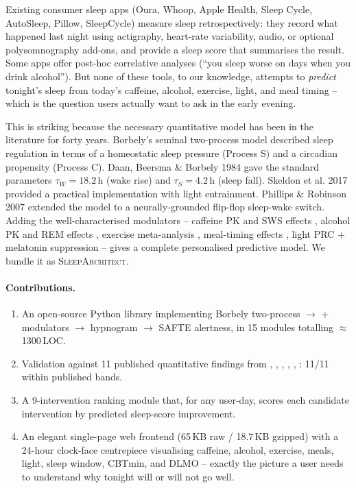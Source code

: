\documentclass[10pt,twocolumn]{article}
\begin{document}
Existing consumer sleep apps (Oura, Whoop, Apple Health,
Sleep Cycle, AutoSleep, Pillow, SleepCycle) measure sleep
retrospectively: they record what happened last night using
actigraphy, heart-rate variability, audio, or optional polysomnography
add-ons, and provide a sleep score that summarises the result.
Some apps offer post-hoc correlative analyses (``you sleep worse on
days when you drink alcohol'').  But none of these tools, to our
knowledge, attempts to \emph{predict} tonight's sleep from today's
caffeine, alcohol, exercise, light, and meal timing -- which is the
question users actually want to ask in the early evening.

This is striking because the necessary quantitative model has been
in the literature for forty years.  Borbely's seminal two-process
model \citep{borbely1982two} described sleep regulation in terms of
a homeostatic sleep pressure (Process S) and a circadian propensity
(Process C).  Daan, Beersma \& Borbely 1984
\citep{daan1984timing} gave the standard parameters
$\tau_W = 18.2$\,h (wake rise) and $\tau_S = 4.2$\,h (sleep fall).
Skeldon et al. 2017 \citep{skeldon2017} provided a practical
implementation with light entrainment.  Phillips \& Robinson 2007
\citep{phillips2007} extended the model to a neurally-grounded
flip-flop sleep-wake switch.  Adding the well-characterised modulators
-- caffeine PK and SWS effects \citep{carrillo2000,drake2013,clark2017},
alcohol PK and REM effects \citep{ebrahim2013}, exercise meta-analysis
\citep{stutz2019}, meal-timing effects \citep{crispim2011,iao2021},
light PRC + melatonin suppression
\citep{khalsa2003,zeitzer2000,brainard2001} -- gives a complete
personalised predictive model.  We bundle it as
\textsc{SleepArchitect}.

\paragraph{Contributions.}
\begin{enumerate}\setlength{\itemsep}{0pt}
\item An open-source Python library implementing Borbely two-process
$\rightarrow$ + modulators $\rightarrow$ hypnogram $\rightarrow$
SAFTE alertness, in 15 modules totalling $\approx$\,1300\,LOC.
\item Validation against 11 published quantitative findings from
\citet{drake2013}, \citet{clark2017}, \citet{ebrahim2013},
\citet{zeitzer2000}, \citet{khalsa2003}, \citet{brainard2001}: 11/11
within published bands.
\item A 9-intervention ranking module that, for any user-day, scores
each candidate intervention by predicted sleep-score improvement.
\item An elegant single-page web frontend (65\,KB raw /
18.7\,KB gzipped) with a 24-hour clock-face centrepiece visualising
caffeine, alcohol, exercise, meals, light, sleep window, CBTmin,
and DLMO -- exactly the picture a user needs to understand why
tonight will or will not go well.
\end{enumerate}
\end{document}
